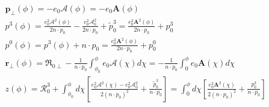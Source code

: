 \begin{align}
   & \mathbf{p}_{\perp}(\phi)=-e_{0} \boldsymbol{\mathcal { A }}(\phi) =-e_{0} \mathbf{A}(\phi)                                                                                                                                                  \nonumber                                                                                                                                                                                   \\
   & p^{3}(\phi)=\frac{e_{0}^{2} {\boldsymbol{\mathcal{A}}}^{2}(\phi)}{2 n \cdot p_{0}}-\frac{e_{0}^{2} {\boldsymbol{\mathcal{A}}}_{0}^{2}}{2 n \cdot p_{0}}+\widetilde p_{0}^{3}=\frac{e_{0}^{2} \mathbf{A}^{2}(\phi)}{2 n \cdot p_{0}}+p_{0}^{3}                                                                                                                                             \nonumber                                     \\
   & p^{0}(\phi)=p^{3}(\phi)+n \cdot p_{0} =\frac{e_{0}^{2} \mathbf{A}^{2}(\phi)}{2 n \cdot p_{0}}+p_{0}^{0}                                                                                                                                             \nonumber                                                                                                                                                                           \\
   & \mathbf{r}_{\perp}(\phi)=\boldsymbol{\mathfrak{R}}_{0 \perp}-\frac{1}{n \cdot p_{0}} \int_{\phi_{0}}^{\phi} e_{0} \boldsymbol{\mathcal {A }}(\chi) d \chi = -\frac{1}{n \cdot p_{0}} \int_{0}^{\phi} e_{0} \mathbf{A}(\chi) d \chi                  \nonumber                                                                                                                                                                           \\
   & z(\phi)=\mathcal{R}_{0}^{3}+\int_{\phi_{0}}^{\phi} d \chi\left[\frac{e_{0}^{2} \boldsymbol{\mathcal { A }}^{2}(\chi)-e_{0}^{2} \boldsymbol{\mathcal { A }}_{0}^{2}}{2\left(n \cdot p_{0}\right)^{2}}+\frac{\widetilde p_{0}^{3}}{n \cdot p_{0}}\right] = \int_{0}^{\phi} d \chi\left[\frac{e_{0}^{2} \mathbf{A}^{2}(\chi)}{2\left(n \cdot p_{0}\right)^{2}}+\frac{p_{0}^{3}}{n \cdot p_{0}}\right]\label{trajectory_mono_gamma_head_on}
\end{align}


